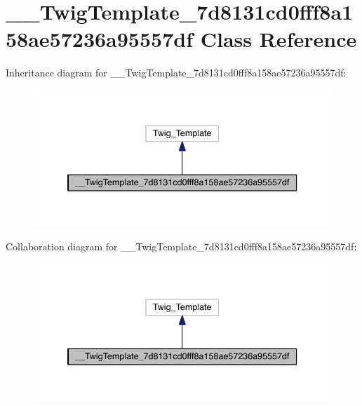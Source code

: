 \hypertarget{class_____twig_template__7d8131cd0fff8a158ae57236a95557df}{\section{\-\_\-\-\_\-\-Twig\-Template\-\_\-7d8131cd0fff8a158ae57236a95557df Class Reference}
\label{class_____twig_template__7d8131cd0fff8a158ae57236a95557df}
}


Inheritance diagram for \-\_\-\-\_\-\-Twig\-Template\-\_\-7d8131cd0fff8a158ae57236a95557df\-:
\nopagebreak
\begin{figure}[H]
\begin{center}
\leavevmode
\includegraphics[width=338pt]{class_____twig_template__7d8131cd0fff8a158ae57236a95557df__inherit__graph}
\end{center}
\end{figure}


Collaboration diagram for \-\_\-\-\_\-\-Twig\-Template\-\_\-7d8131cd0fff8a158ae57236a95557df\-:
\nopagebreak
\begin{figure}[H]
\begin{center}
\leavevmode
\includegraphics[width=338pt]{class_____twig_template__7d8131cd0fff8a158ae57236a95557df__coll__graph}
\end{center}
\end{figure}
